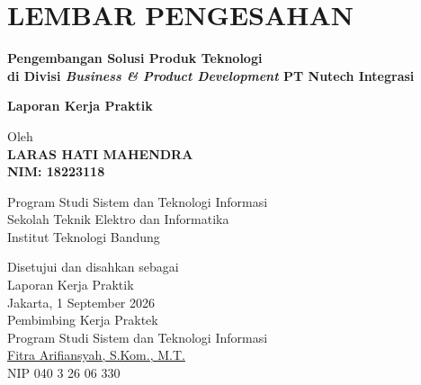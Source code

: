 \chapter*{LEMBAR PENGESAHAN}


\begin{center}
    \vspace*{1cm}
  {\large\bfseries Pengembangan Solusi Produk Teknologi \\di Divisi \textit{Business \& Product Development} PT Nutech Integrasi}\\
     \vspace{1.2cm}

  {\Large \textbf{Laporan Kerja Praktik}}\\


  \vspace{1cm}
    
    
  {\large Oleh}\\[0.3cm]
    \textbf{
    {\large LARAS HATI MAHENDRA}\\
    {\large NIM: 18223118}
  }\\
    
  \vspace{0.5cm}
 
  {\large Program Studi Sistem dan Teknologi Informasi}\\
  {\large Sekolah Teknik Elektro dan Informatika}\\
  {\large Institut Teknologi Bandung}\\

  \vspace{1cm}

  Disetujui dan disahkan sebagai\\
  Laporan Kerja Praktik\\
  Jakarta, 1 September 2026\\[1cm]

	Pembimbing Kerja Praktek\\
	Program Studi Sistem dan Teknologi Informasi\\[3cm]
	\underline{Fitra Arifiansyah, S.Kom., M.T.}\\[0.2cm]
	NIP 040 3 26 06 330

\end{center}

\vspace{1cm}
\noindent

